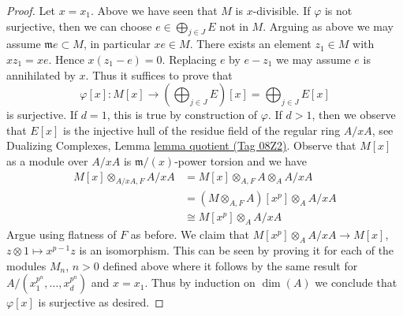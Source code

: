 \documentclass{amsart}
\theoremstyle{plain}
\theoremstyle{definition}
\theoremstyle{remark}
\numberwithin{equation}{subsection}
\begin{document}
\begin{proof}
\medskip\noindent
Let $x = x_1$. Above we have seen that $M$ is $x$-divisible.
If $\varphi$ is not surjective, then we can choose
$e \in \bigoplus_{j \in J} E$ not in $M$.
Arguing as above we may assume $\mathfrak m e \subset M$,
in particular $x e \in M$. There exists an element
$z_1 \in M$ with $x z_1 = x e$. Hence
$x(z_1 - e) = 0$. Replacing $e$ by $e - z_1$
we may assume $e$ is annihilated by $x$.
Thus it suffices to prove that
$$
\varphi[x] :
M[x]
\longrightarrow
\left(\bigoplus\nolimits_{j \in J} E\right)[x] =
\bigoplus\nolimits_{j \in J} E[x]
$$
is surjective. If $d = 1$, this is true by construction of $\varphi$.
If $d > 1$, then we observe that $E[x]$ is the injective hull
of the residue field of the regular ring $A/xA$, see
Dualizing Complexes, Lemma \href{https://stacks.math.columbia.edu/tag/08Z2}{lemma quotient (Tag 08Z2)}.
Observe that $M[x]$ as a module over $A/xA$
is $\mathfrak m/(x)$-power torsion and we have
\begin{align*}
M[x] \otimes_{A/xA, F} A/xA
& = M[x] \otimes_{A, F} A \otimes_A A/xA \\
& = (M \otimes_{A, F} A)[x^p] \otimes_A A/xA \\
& \cong M[x^p] \otimes_A A/xA
\end{align*}
Argue using flatness of $F$ as before.
We claim that $M[x^p] \otimes_A A/xA \to M[x]$,
$z \otimes 1 \mapsto x^{p - 1}z$ is an isomorphism.
This can be seen by proving it for
each of the modules $M_n$, $n > 0$ defined above
where it follows by the same result for
$A/(x_1^{p^n}, \ldots, x_d^{p^n})$ and $x = x_1$.
Thus by induction on $\dim(A)$ we conclude that $\varphi[x]$
is surjective as desired.
\end{proof}
\end{document}
